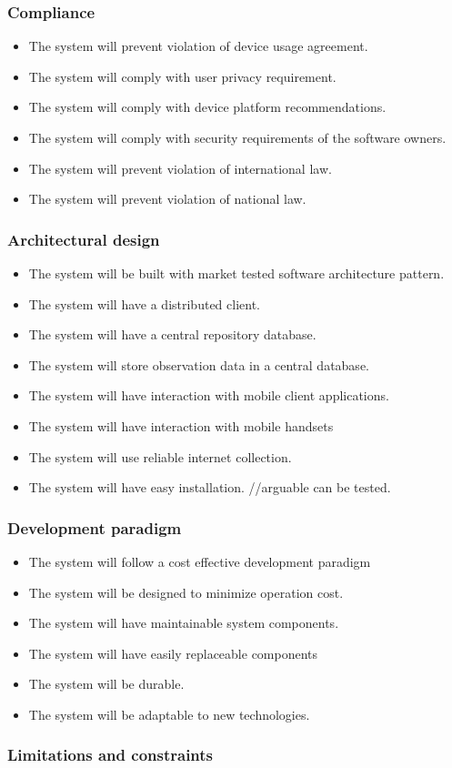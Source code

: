 \subsubsection{Compliance}
		\begin{itemize}
		     \item The system will prevent violation of device usage agreement.
             \item The system will comply with user privacy requirement.
             \item The system will comply with device platform recommendations.
             \item The system will comply with security requirements of the software owners.
             \item The system will prevent violation of international law.
             \item The system will prevent violation of national law.

	    \end{itemize}
\subsubsection{Architectural design}
    \begin{itemize}
        \item The system will be built with market tested software architecture pattern.
        \item The system will have a distributed client.
        \item The system will have a central repository database.
        \item The system will store observation data in a central database.
        \item The system will have interaction with mobile client applications.
        \item The system will have interaction with mobile handsets
        \item The system will use reliable internet collection.
        \item The system will have easy installation. //arguable can be tested.

    \end{itemize}
\subsubsection{Development paradigm}
    \begin{itemize}
        \item The system will follow a cost effective development paradigm
        \item The system will be designed to minimize operation cost.
        \item The system will have maintainable system components.
        \item The system will have easily replaceable components
        \item The system will be durable.
        \item The system will be adaptable to new technologies.

    \end{itemize}
\subsubsection{Limitations and constraints}
